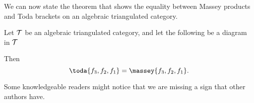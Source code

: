 We can now state the theorem that shows the equality between Massey products and Toda brackets on an algebraic triangulated category.

\begin{theorem}[Massey products = Toda brackets]
    \label{theorem:massey_equals_toda}
    Let \( {\mathcal{T}} \) be an algebraic triangulated category, and let the following be a diagram in \( {\mathcal{T}} \)
    \begin{center}
    \end{center}

    Then
    \[
        \toda{f_3, f_2, f_1} = \massey{f_3, f_2, f_1}.
    \]
\end{theorem}

Some knowledgeable readers might notice that we are missing a sign that other authors have.

